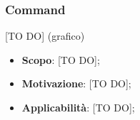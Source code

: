 		\subsubsection{Command} %
		\label{ssub:command}
		[TO DO] (grafico)
		\begin{itemize}
			\item \textbf{Scopo}: [TO DO];
			\item \textbf{Motivazione}: [TO DO];
			\item \textbf{Applicabilità}: [TO DO];
		\end{itemize}



